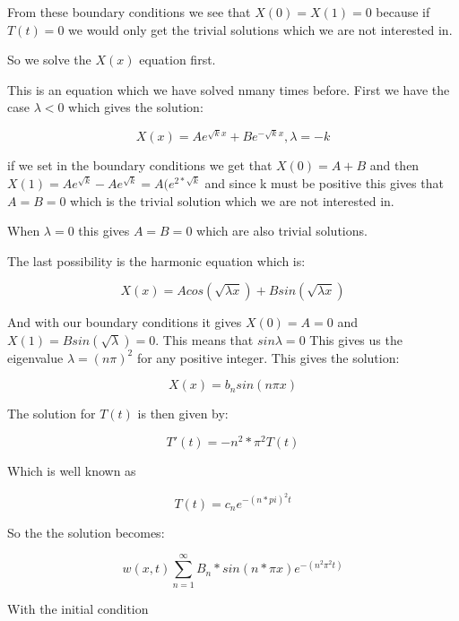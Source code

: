 \documentclass[a4paper,10pt]{article}
\begin{document}
From these boundary conditions we see that $X(0) = X(1) = 0$ because if $T(t)=0$ we would only get the trivial solutions which we are not interested in.

So we solve the $X(x)$ equation first.

This is an equation which we have solved nmany times before. First we have the case $\lambda < 0$ which gives the solution:

\begin{equation}
  X(x) = Ae^{\sqrt{k}x} + Be^{-\sqrt{k}x}, \lambda=-k
\end{equation}

if we set in the boundary conditions we get that $X(0) = A+B$ and then $X(1) = Ae^{\sqrt{k}} - Ae^{\sqrt{k}} = A(e^{2*\sqrt{k}}$ and since k must
be positive this gives that $A=B=0$ which is the trivial solution which we are not interested in.

When $\lambda = 0 $ this gives $A=B=0$ which are also trivial solutions.

The last possibility is the harmonic equation which is:

\begin{equation}
  X(x) = Acos(\sqrt{\lambda x}) + Bsin(\sqrt{\lambda x})
\end{equation}

And with our boundary conditions it gives $X(0) = A = 0$ and $X(1) = Bsin(\sqrt{\lambda}) = 0$.
This means that $sin\lambda = 0$ This gives us the eigenvalue $\lambda = (n\pi)^2$ for any positive integer.
This gives the solution:

\begin{equation}
 X(x) = b_nsin(n\pi x)
\end{equation}

The solution for $T(t)$ is then given by:

\begin{equation}
 T'(t) = -n^2*\pi ^2 T(t)
\end{equation}

Which is well known as 

\begin{equation}
 T(t) = c_ne^{-(n*pi)^2t}
\end{equation}

So the the solution becomes:

\begin{equation}
 w(x,t) \sum_{n=1}^{\infty} B_n*sin(n*\pi x)e^{-(n^2\pi^2t)}
 \end{equation}
 
With the initial condition
\end{document}
